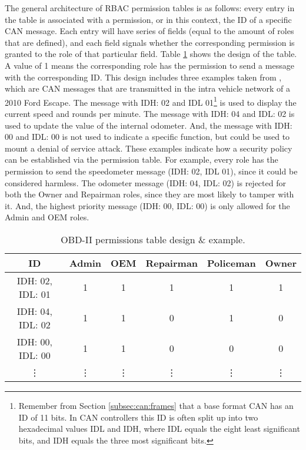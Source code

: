 The general architecture of RBAC permission tables is as follows: every entry in the table is associated with a permission, or in this context, the ID of a specific CAN message. Each entry will have series of fields (equal to the amount of roles that are defined), and each field signals whether the corresponding permission is granted to the role of that particular field. Table \ref{table:2} shows the design of the table. A value of 1 means the corresponding role has the permission to send a message with the corresponding ID. This design includes three examples taken from \cite{MillerC}, which are CAN messages that are transmitted in the intra vehicle network of a 2010 Ford Escape. The message with IDH: 02 and IDL 01\footnote{Remember from Section \ref{subsec:can:frames} that a base format CAN has an ID of 11 bits. In CAN controllers this ID is often split up into two hexadecimal values IDL and IDH, where IDL equals the eight least significant bits, and IDH equals the three most significant bits.} is used to display the current speed and rounds per minute. The message with IDH: 04 and IDL: 02 is used to update the value of the internal odometer. And, the message with IDH: 00 and IDL: 00 is not used to indicate a specific function, but could be used to mount a denial of service attack. These examples indicate how a security policy can be established via the permission table. For example, every role has the permission to send the speedometer message (IDH: 02, IDL 01), since it could be considered harmless. The odometer message (IDH: 04, IDL: 02) is rejected for both the Owner and Repairman roles, since they are most likely to tamper with it. And, the highest priority message (IDH: 00, IDL: 00) is only allowed for the Admin and OEM roles.

\begin{table}[]
	\begin{tabular}{|c|c|c|c|c|c|}
		\hline
		\rowcolor[HTML]{9B9B9B} ID & Admin & OEM & Repairman & Policeman & Owner \\ \hline
		\cellcolor[HTML]{9B9B9B} IDH: 02, IDL: 01 & 1 & 1 & 1 & 1 & 1 \\ \hline
		\cellcolor[HTML]{9B9B9B} IDH: 04, IDL: 02 & 1 & 1 & 0 & 1 & 0 \\ \hline
		\cellcolor[HTML]{9B9B9B} IDH: 00, IDL: 00 & 1 & 1 & 0 & 0 & 0 \\ \hline
		\cellcolor[HTML]{9B9B9B} \vdots & \vdots & \vdots & \vdots & \vdots & \vdots
	\end{tabular}
	\caption{OBD-II permissions table design \& example.}
	\label{table:2}
\end{table}



